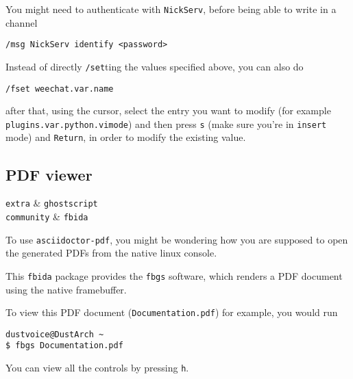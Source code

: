\documentclass[10pt]{dustdoc}
\begin{document}
\begin{NOTE}
    You might need to authenticate with \texttt{NickServ}, before being able to write in a channel

    \begin{verbatim}
/msg NickServ identify <password>
    \end{verbatim}
\end{NOTE}
\begin{NOTE}
    Instead of directly \texttt{/set}ting the values specified above, you can also do

    \begin{verbatim}
/fset weechat.var.name
    \end{verbatim}

    \noindent
    after that, using the cursor, select the entry you want to modify (for example \texttt{plugins.var.python.vimode}) and then press \texttt{s} (make sure you’re in \texttt{insert} mode) and \texttt{Return}, in order to modify the existing value.
\end{NOTE}

\subsection{PDF viewer}
\label{sec:console-pdf-viewer}

\begin{packagetable}
    \texttt{extra} & \texttt{ghostscript} \\
    \texttt{community} & \texttt{fbida} \\
\end{packagetable}

To use \texttt{asciidoctor-pdf}, you might be wondering how you are supposed to open the generated PDFs from the native linux console.

This \texttt{fbida} package provides the \texttt{fbgs} software, which renders a PDF document using the native framebuffer.

To view this PDF document (\texttt{Documentation.pdf}) for example, you would run

\begin{verbatim}
dustvoice@DustArch ~
$ fbgs Documentation.pdf
\end{verbatim}

\begin{NOTE}
    You can view all the controls by pressing \texttt{h}.
\end{NOTE}
\end{document}
